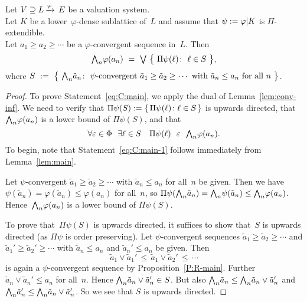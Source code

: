 \documentclass[main.tex]{subfiles}
\begin{document}
%
%
\begin{cor}
\label{C:main}
Let $V \supseteq L\,\smash{\xrightarrow{\varphi}\,E}$ be a valuation system.\\
Let $K$ be a lower~$\varphi$-dense sublattice of~$L$
and assume that $\psi := \varphi | K$ is $\Pi$-extendible.\\
Let $a_1 \geq a_2 \geq \dotsb$ be a $\varphi$-convergent sequence in~$L$.
Then
\begin{equation}
\label{eq:C:main}
\bw_n \varphi(a_n) \ = \ 
\bv\ \bigl\{\ \Pi \psi(\ell) \colon \ 
 \ell \in S \ \bigr\},
\end{equation}
where 
$S \ \eqdf\ 
\bigl\{\ \bw_n \tilde a_n \colon\ 
\text{$\psi$-convergent $\tilde a_1 \geq \tilde a_2 \geq \dotsb$
with $\tilde a_n \leq a_n$ for all~$n$}\ \bigr\}$.
\end{cor}
\begin{proof}
To prove Statement~\eqref{eq:C:main},
we apply the dual of Lemma~\ref{lem:conv-inf}.
We need to verify 
that  $\Pi\psi(S):=\{\,\Pi\psi(\ell) \colon \ell \in S\,\}$
is upwards directed,
that~$\textstyle{\bigwedge}_n\varphi(a_n)$
is a lower bound of   $\Pi\psi(S)$,
and that
\begin{equation}
\label{eq:C:main-1}
\forall \varepsilon \in \Phi\ \ 
\exists \ell\in S\quad  \Pi\psi(\ell) \ \ \ve \ \ \bw_n \varphi(a_n).
\end{equation}
To begin,
note that Statement~\eqref{eq:C:main-1} follows immediately
from Lemma~\ref{lem:main}.

Let $\psi$-convergent 
$\tilde a_1 \geq \tilde a_2 \geq \dotsb$
with $\tilde a_n \leq a_n$ for all~$n$ be given.
Then we have  $\psi(\tilde a_n) = \varphi(\tilde a_n)\leq \varphi(a_n)$
for all~$n$, so $\Pi\psi(\textstyle{\bigwedge}_n\tilde a_n) = \textstyle{\bigwedge}_n \psi(\tilde a_n) 
\leq \textstyle{\bigwedge}_n \varphi(a_n)$.
Hence~$\textstyle{\bigwedge}_n\varphi(a_n)$
is a lower bound of $\Pi\psi(S)$.
 
To prove that~$\Pi\psi(S)$
is upwards directed,
it suffices to show that~$S$
is upwards directed 
(as $\Pi\psi$ is order preserving).
Let $\psi$-convergent sequences 
$\tilde a_1 \geq \tilde a_2 \geq \dotsb$
and
$\tilde a_1' \geq \tilde a_2' \geq \dotsb$
with $\tilde a_n \leq a_n$ and $\tilde a_n' \leq a_n$
be given.
Then 
\begin{equation*}
\tilde a_1 \vee \tilde a_1' \,\leq\, 
\tilde a_1 \vee \tilde a_2' \,\leq\,\dotsb
\end{equation*}
is again a $\psi$-convergent sequence by Proposition~\ref{P:R-main}.
Further $\tilde a_n \vee \tilde a_n' \leq a_n$
for all~$n$.
Hence $\textstyle{\bigwedge}_n \tilde a_n \vee \tilde a_n' \in S$.
But also $\textstyle{\bigwedge}_n\tilde a_n \leq \textstyle{\bigwedge}_n \tilde a_n \vee\tilde a_n'$
and $\textstyle{\bigwedge}_n\tilde a_n' \leq \textstyle{\bigwedge}_n \tilde a_n \vee \tilde a_n'$.
So we see that $S$ is upwards directed.
\end{proof}
\end{document}
